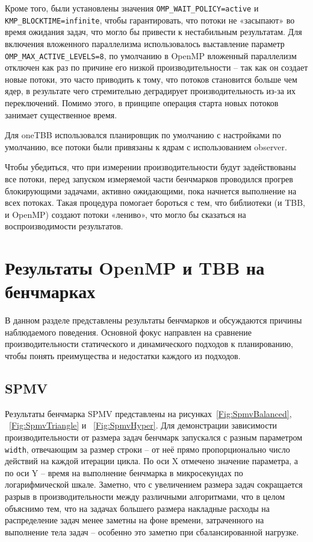\documentclass[times,specification,annotation]{itmo-student-thesis}
\begin{document}
Кроме того, были установлены значения \texttt{OMP\_WAIT\_POLICY=active} и \texttt{KMP\_BLOCKTIME=infinite}, чтобы гарантировать, что потоки не «засыпают» во время ожидания задач, что могло бы привести к нестабильным результатам. Для включения вложенного параллелизма использовалось выставление параметр \texttt{OMP\_MAX\_ACTIVE\_LEVELS=8}, по умолчанию в OpenMP вложенный параллелизм отключен как раз по причине его низкой производительности -- так как он создает новые потоки, это часто приводить к тому, что потоков становится больше чем ядер, в результате чего стремительно деградирует производительность из-за их переключений. Помимо этого, в принципе операция старта новых потоков занимает существенное время.

Для oneTBB использовался планировщик по умолчанию с настройками по умолчанию, все потоки были привязаны к ядрам с использованием observer. ~\cite{protbb-pinning}

Чтобы убедиться, что при измерении производительности будут задействованы все потоки, перед запуском измеряемой части бенчмарков проводился прогрев блокирующими задачами, активно ожидающими, пока начнется выполнение на всех потоках. Такая процедура помогает бороться с тем, что библиотеки (и TBB, и OpenMP) создают потоки «лениво», что могло бы сказаться на воспроизводимости результатов.

\section{Результаты OpenMP и TBB на бенчмарках}
В данном разделе представлены результаты бенчмарков и обсуждаются причины наблюдаемого поведения. Основной фокус направлен на сравнение производительности статического и динамического подходов к планированию, чтобы понять преимущества и недостатки каждого из подходов.

\subsection{SPMV}
Результаты бенчмарка SPMV представлены на рисунках~\ref{Fig:SpmvBalanced}, ~\ref{Fig:SpmvTriangle} и ~\ref{Fig:SpmvHyper}. Для демонстрации зависимости производительности от размера задач бенчмарк запускался с разным параметром \texttt{width}, отвечающим за размер строки -- от неё прямо пропорционально число действий на каждой итерации цикла. По оси X отмечено значение параметра, а по оси Y -- время на выполнение бенчмарка в микросекундах по логарифмической шкале. Заметно, что с увеличением размера задач сокращается разрыв в производительности между различными алгоритмами, что в целом объяснимо тем, что на задачах большего размера накладные расходы на распределение задач менее заметны на фоне времени, затраченного на выполнение тела задач -- особенно это заметно при сбалансированной нагрузке.
\end{document}
